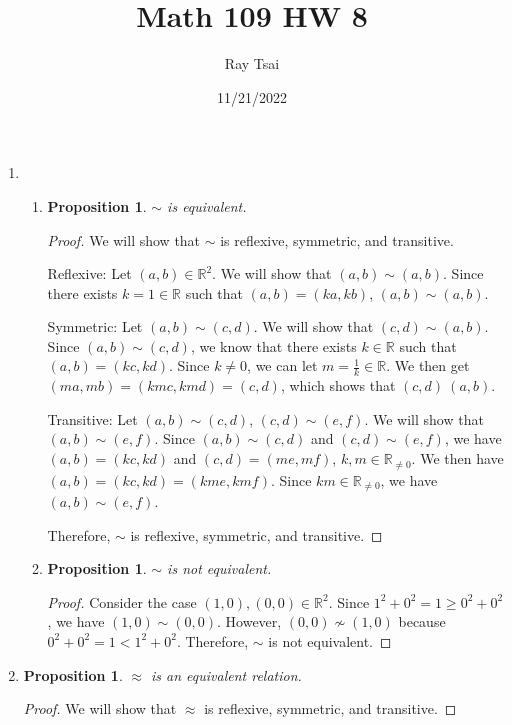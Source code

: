 \documentclass{article}
\title{Math 109 HW 8}
\author{Ray Tsai}
\date{11/21/2022}
\newtheorem{prop}[thm]{Proposition}
\begin{document}
 

\maketitle 

\begin{enumerate}
\item \begin{enumerate}
\item \begin{prop}
    $\sim$ is equivalent.
\end{prop}
\begin{proof}
    We will show that $\sim$ is reflexive, symmetric, and transitive.

    Reflexive: Let $(a, b) \in \mathbb{R}^2$. We will show that $(a, b) \sim (a, b)$. Since there exists $k = 1 \in \mathbb{R}$ such that $(a, b) = (ka, kb)$, $(a, b) \sim (a, b)$.

    Symmetric: Let $(a, b) \sim (c, d)$. We will show that $(c, d) \sim (a, b)$. Since $(a, b) \sim (c, d)$, we know that there exists $k \in \mathbb{R}$ such that $(a, b) = (kc, kd)$. Since $k \neq 0$, we can let $m = \frac{1}{k} \in \mathbb{R}$. We then get $(ma, mb) = (kmc, kmd) = (c, d)$, which shows that $(c, d) ~ (a, b)$.

    Transitive: Let $(a, b) \sim (c, d)$, $(c, d) \sim (e, f)$. We will show that $(a, b) \sim (e, f)$. Since $(a, b) \sim (c, d)$ and $(c, d) \sim (e, f)$, we have $(a, b) = (kc, kd)$ and $(c, d) = (me, mf)$, $k, m \in \mathbb{R}_{\neq 0}$. We then have $(a, b) = (kc, kd) = (kme, kmf)$. Since $km \in \mathbb{R}_{\neq 0}$, we have $(a, b) \sim (e, f)$.

    Therefore, $\sim$ is reflexive, symmetric, and transitive.
\end{proof}

\item \begin{prop}
    $\sim$ is not equivalent.
\end{prop}
\begin{proof}
    Consider the case $(1, 0), (0, 0) \in \mathbb{R}^2$. Since $1^2 + 0^2 = 1 \geq 0^2 + 0^2$, we have $(1, 0) \sim (0, 0)$. However, $(0, 0) \not\sim (1, 0)$ because $0^2 + 0^2 = 1 < 1^2 + 0^2$. Therefore, $\sim$ is not equivalent.
\end{proof}
\end{enumerate}

\item 
\begin{prop}
    $\approx$ is an equivalent relation.
\end{prop}
\begin{proof}
    We will show that $\approx$ is reflexive, symmetric, and transitive.


\end{proof}
\end{enumerate}
\end{document}

